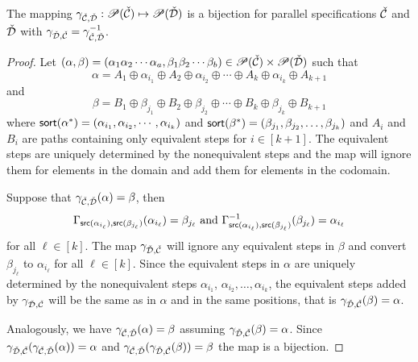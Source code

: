 \begin{proposition}
The mapping $\gamma_{\check{\mathcal{C}},\check{\mathcal{D}}}: \mathscr{P}(\check{\mathcal{C}}) \mapsto \mathscr{P}(\check{\mathcal{D}})$ is a bijection for parallel specifications $\check{\mathcal{C}}$ and $\check{\mathcal{D}}$ with $\gamma_{\check{\mathcal{D}},\check{\mathcal{C}}} = \gamma_{\check{\mathcal{C}},\check{\mathcal{D}}}^{-1}$.
\end{proposition}
\begin{proof}
Let $(\alpha,\beta) = (\alpha_1\alpha_2\dotsm\alpha_a,\beta_1\beta_2\dotsm\beta_b)\in \mathscr{P}(\check{\mathcal{C}}) \times \mathscr{P}(\check{\mathcal{D}})$ such that
\[
    \alpha = A_1 \oplus \alpha_{i_1} \oplus A_2 \oplus \alpha_{i_2} \oplus \dotsm \oplus A_k \oplus \alpha_{i_k} \oplus A_{k+1}
\]
and
\[
    \beta = B_1 \oplus \beta_{j_1} \oplus B_2 \oplus \beta_{j_2} \oplus \dotsm \oplus B_k \oplus \beta_{j_k} \oplus B_{k+1}
\]
where $\textsf{sort}(\alpha^\ast) = (\alpha_{i_1},\alpha_{i_2},\dotsm,\alpha_{i_k})$ and $\textsf{sort}(\beta^\ast) = (\beta_{j_1},\beta_{j_2},\dotsc,\beta_{j_k})$ and $A_i$ and $B_i$ are paths containing only equivalent steps for $i \in [k+1]$. The equivalent steps are uniquely determined by the nonequivalent steps and the map will ignore them for elements in the domain and add them for elements in the codomain.

Suppose that $\gamma_{\check{\mathcal{C}},\check{\mathcal{D}}}(\alpha) = \beta$, then
\[
    \Gamma_{\textsf{src}(\alpha_{i_\ell}),\textsf{src}(\beta_{j_\ell})}(\alpha_{i_\ell}) = \beta_{j_\ell} \text{ and }
    \Gamma_{\textsf{src}(\alpha_{i_\ell}),\textsf{src}(\beta_{j_\ell})}^{-1}(\beta_{j_\ell}) = \alpha_{i_\ell}
\]
for all $\ell \in [k]$. The map $\gamma_{\check{\mathcal{D}},\check{\mathcal{C}}}$ will ignore any equivalent steps in $\beta$ and convert $\beta_{j_\ell}$ to $\alpha_{i_\ell}$ for all $\ell \in [k]$. Since the equivalent steps in $\alpha$ are uniquely determined by the nonequivalent steps $\alpha_{i_1}$, $\alpha_{i_2}, \dotsc, \alpha_{i_k}$, the equivalent steps added by $\gamma_{\check{\mathcal{D}},\check{\mathcal{C}}}$ will be the same as in $\alpha$ and in the same positions, that is $\gamma_{\check{\mathcal{D}},\check{\mathcal{C}}}(\beta) = \alpha$.

Analogously, we have $\gamma_{\check{\mathcal{C}},\check{\mathcal{D}}}(\alpha) = \beta$ assuming $\gamma_{\check{\mathcal{D}},\check{\mathcal{C}}}(\beta) = \alpha$. Since $\gamma_{\check{\mathcal{D}},\check{\mathcal{C}}}(\gamma_{\check{\mathcal{C}},\check{\mathcal{D}}}(\alpha)) = \alpha$ and $\gamma_{\check{\mathcal{C}},\check{\mathcal{D}}}(\gamma_{\check{\mathcal{D}},\check{\mathcal{C}}}(\beta)) = \beta$ the map is a bijection.
\end{proof}

